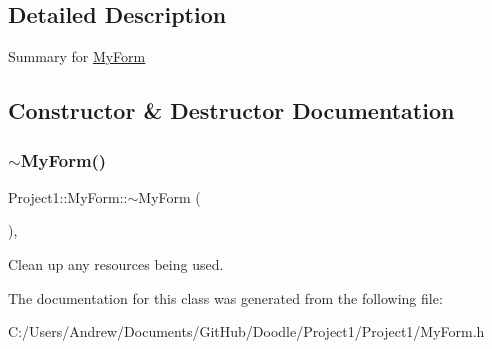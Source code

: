 \subsection{Detailed Description}
Summary for \mbox{\hyperlink{class_project1_1_1_my_form}{My\+Form}} 



\subsection{Constructor \& Destructor Documentation}
\mbox{\label{class_project1_1_1_my_form_a501b2b4481b72877fc73101f1d6f26be}} 
\subsubsection{\texorpdfstring{$\sim$\+My\+Form()}{~MyForm()}}
{\footnotesize\ttfamily Project1\+::\+My\+Form\+::$\sim$\+My\+Form (\begin{DoxyParamCaption}{ }\end{DoxyParamCaption})\hspace{0.3cm}{\ttfamily [inline]}, {\ttfamily [protected]}}



Clean up any resources being used. 



The documentation for this class was generated from the following file\+:\begin{DoxyCompactItemize}
\item 
C\+:/\+Users/\+Andrew/\+Documents/\+Git\+Hub/\+Doodle/\+Project1/\+Project1/My\+Form.\+h\end{DoxyCompactItemize}
